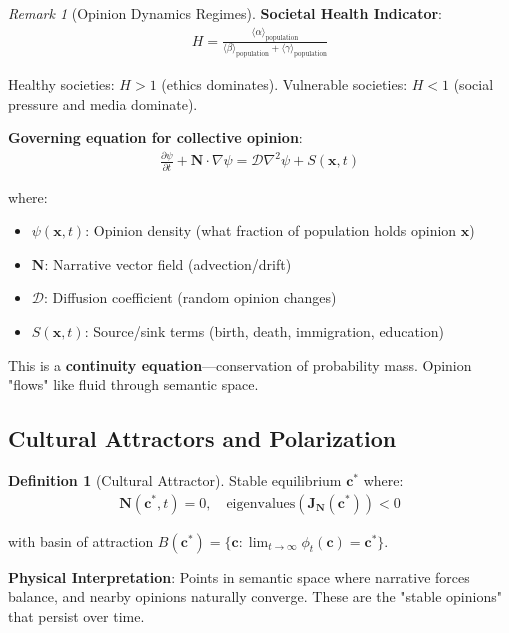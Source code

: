 \documentclass[11pt,a4paper]{article}
\theoremstyle{definition}
\newtheorem{definition}{Definition}[section]
\theoremstyle{remark}
\newtheorem{remark}{Remark}[section]
\newcommand{\cc}{\mathbf{c}}
\begin{document}
\begin{small}
\begin{enumerate}
\begin{remark}[Opinion Dynamics Regimes]
\textbf{Societal Health Indicator}:
\begin{align}
H = \frac{\langle \alpha \rangle_{\text{population}}}{\langle \beta \rangle_{\text{population}} + \langle \gamma \rangle_{\text{population}}}
\end{align}

Healthy societies: \(H > 1\) (ethics dominates). Vulnerable societies: \(H < 1\) (social pressure and media dominate).
\end{remark}

\textbf{Governing equation for collective opinion}:
\begin{align}
\frac{\partial \psi}{\partial t} + \mathbf{N} \cdot \nabla \psi = \mathcal{D} \nabla^2 \psi + S(\mathbf{x}, t)
\end{align}

where:
\begin{itemize}
    \item \(\psi(\mathbf{x}, t)\): Opinion density (what fraction of population holds opinion \(\mathbf{x}\))
    \item \(\mathbf{N}\): Narrative vector field (advection/drift)
    \item \(\mathcal{D}\): Diffusion coefficient (random opinion changes)
    \item \(S(\mathbf{x}, t)\): Source/sink terms (birth, death, immigration, education)
\end{itemize}

This is a \textbf{continuity equation}—conservation of probability mass. Opinion "flows" like fluid through semantic space.

\subsection{Cultural Attractors and Polarization}

\begin{definition}[Cultural Attractor]
Stable equilibrium \(\cc^*\) where:
\begin{align}
\mathbf{N}(\cc^*, t) = 0, \quad \text{eigenvalues}(\mathbf{J}_{\mathbf{N}}(\cc^*)) < 0
\end{align}

with basin of attraction \(B(\cc^*) = \{\cc : \lim_{t \to \infty} \phi_t(\cc) = \cc^*\}\).

\textbf{Physical Interpretation}: Points in semantic space where narrative forces balance, and nearby opinions naturally converge. These are the "stable opinions" that persist over time.


\end{definition}
\end{enumerate}
\end{small}
\end{document}
